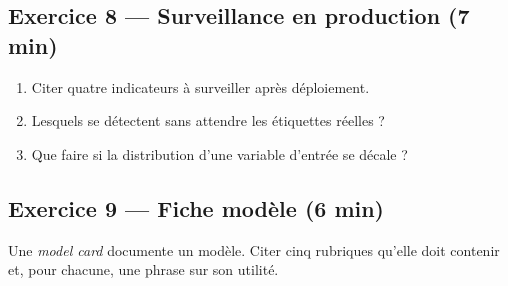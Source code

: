 \subsection*{Exercice 8 --- Surveillance en production \hfill \normalfont\footnotesize (7 min)}
\begin{enumerate}
  \item Citer quatre indicateurs à surveiller après déploiement.
  \item Lesquels se détectent sans attendre les étiquettes réelles ?
  \item Que faire si la distribution d'une variable d'entrée se décale ?
\end{enumerate}

\subsection*{Exercice 9 --- Fiche modèle \hfill \normalfont\footnotesize (6 min)}
Une \emph{model card} documente un modèle. Citer cinq rubriques qu'elle doit
contenir et, pour chacune, une phrase sur son utilité.

\newpage
